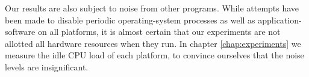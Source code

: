 Our results are also subject to noise from other programs. While attempts have
been made to disable periodic operating-system processes as well as
application-software on all platforms, it is almost certain that our experiments
are not allotted all hardware resources when they run. In chapter
\ref{chap:experiments} we measure the idle CPU load of each platform, to
convince ourselves that the noise levels are insignificant.

